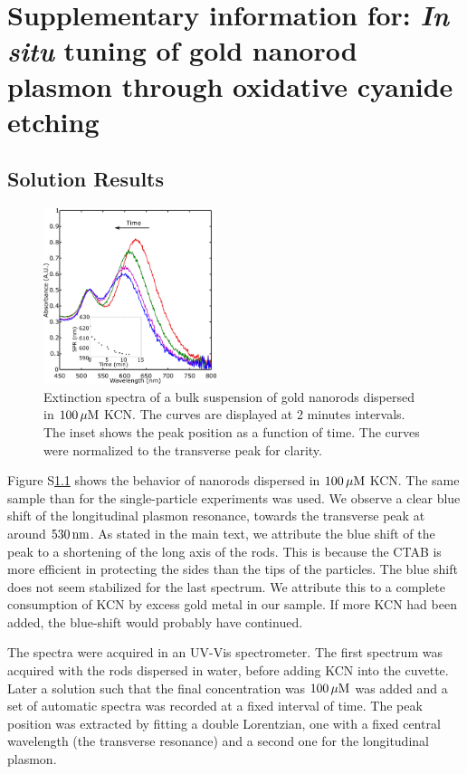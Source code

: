 \chapter[Cyanide Etching]{Supplementary information for: \textit{In situ} tuning of gold
nanorod plasmon through oxidative cyanide etching}
\label{ch:SKCN}

\newpage

\section{Solution Results}
\begin{figure}[htp]
 \centering
 \includegraphics[width=0.45\textwidth]{Chapters/02_KCN/Figures/04_Supporting/01_Bulk/01_bulk.png}
 \caption{Extinction spectra of a bulk suspension of gold nanorods dispersed in
 $100\,\mu\textrm{M}$ KCN. The curves are displayed at 2 minutes intervals. The
 inset shows the peak position as a function of time. The curves were normalized
 to the transverse peak for clarity.}
 \label{fig:Bulk}
\end{figure}

Figure S\ref{fig:Bulk} shows the behavior of nanorods dispersed in $100\,\mu\textrm{M}$ KCN.
The same sample than for the single-particle experiments was used.
We observe a clear blue shift of the longitudinal plasmon resonance, towards the
transverse peak at around $530\,\textrm{nm}$. As stated in the main text, we attribute the
blue shift of the peak to a shortening of the long axis of the rods. This is
because the CTAB is more efficient in protecting the sides than the tips of the
particles. The blue shift does not seem stabilized for the last spectrum. We
attribute this to a complete consumption of KCN by excess gold metal in our
sample. If more KCN had been added, the blue-shift would probably have
continued.

The spectra were acquired in an UV-Vis spectrometer. The first spectrum was
acquired with the rods dispersed in water, before adding KCN into the cuvette.
Later a solution such that the final concentration was $100\,\mu\textrm{M}$ was added and a
set of automatic spectra was recorded at a fixed interval of time. The peak
position was extracted by fitting a double Lorentzian, one with a fixed central
wavelength (the transverse resonance) and a second one for the longitudinal
plasmon.

